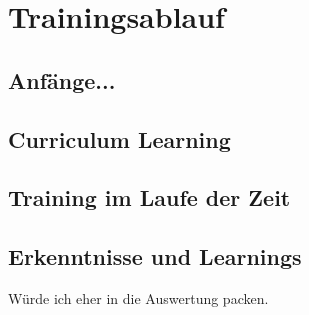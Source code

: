 \newpage
\section{Trainingsablauf}
\subsection{Anfänge...}
\subsection{Curriculum Learning}
\subsection{Training im Laufe der Zeit}
\label{training_zeit}
\subsection{Erkenntnisse und Learnings}
Würde ich eher in die Auswertung packen.

